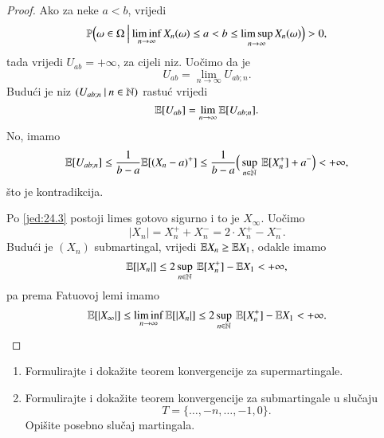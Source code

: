 \begin{proof}
    Ako za neke $a < b$, vrijedi
    \begin{equation*}
        \mathbb{P} \Big( {\omega \in \Omega} \: \Big| \: {\liminf\limits_{n \to \infty} X_n (\omega) \leq a < b \leq \limsup\limits_{n \to \infty} X_n (\omega) } \Big) > 0,
    \end{equation*}
    tada vrijedi $U_{a b} = +\infty$, za cijeli niz.
    Uo\v cimo da je
    \begin{equation*}
        U_{a b} = \lim\limits_{n \to \infty} U_{a b ; n}.
    \end{equation*}
    Budu\' ci je niz $({U_{a b; n}} \: | \: {n \in \mathbb{N}})$ rastu\' c vrijedi
    \begin{equation*}
        \mathbb{E} [U_{a b}] = \lim\limits_{n \to \infty} \mathbb{E} [U_{a b; n}].
    \end{equation*}
    No, imamo
    \begin{equation*}
        \mathbb{E} [U_{a b; n}] \leq \frac{1}{b - a} \mathbb{E} [(X_n - a)^+] \leq \frac{1}{b - a} \Big( \sup\limits_{n \in \mathbb{N}} \: \mathbb{E} [X_n^+] + a^- \Big) < +\infty,
    \end{equation*}
    \v sto je kontradikcija.

    Po \eqref{jed:24.3} postoji limes gotovo sigurno i to je $X_\infty$.
    Uo\v cimo
    \begin{equation*}
        |X_n| = X_n^+ + X_n^- = 2 \cdot X_n^+ - X_n^- .
    \end{equation*}
    Budu\' ci je $(X_n)$ submartingal, vrijedi $\mathbb{E} X_n \geq \mathbb{E} X_1$, odakle imamo
    \begin{equation*}
        \mathbb{E} [|X_n|] \leq 2 \sup\limits_{n \in \mathbb{N}} \: \mathbb{E} [X_n^+] - \mathbb{E} X_1 < +\infty,
    \end{equation*}
    pa prema Fatuovoj lemi imamo
    \begin{equation*}
        \mathbb{E} [|X_\infty|] \leq \liminf\limits_{n \to \infty} \mathbb{E} [|X_n|] \leq 2 \sup\limits_{n \in \mathbb{N}} \: \mathbb{E} [X_n^+] - \mathbb{E} X_1 < +\infty.
    \end{equation*}
\end{proof}

\begin{zad} \label{zad:24.5}
    \begin{enumerate}[label=(\alph*)]
        \item \label{zad:24.5.1}
        Formulirajte i doka\v zite teorem konvergencije za supermartingale.
        \item \label{zad:24.5.2}
        Formulirajte i doka\v zite teorem konvergencije za submartingale u slu\v caju
        \begin{equation*}
            T = \{ \ldots, -n, \ldots, -1, 0 \}.
        \end{equation*}
        Opi\v site posebno slu\v caj martingala.
    \end{enumerate}
\end{zad}

